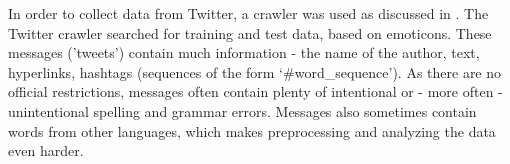 
In order to collect data from Twitter, a crawler was used as discussed in \cite{sagimoral}. The Twitter crawler searched for training and test data, based on emoticons. These messages ('tweets') contain much information - the name of the author, text, hyperlinks, hashtags (sequences of the form `\#word\_sequence'). As there are no official restrictions, messages often contain plenty of intentional or - more often - unintentional spelling and grammar errors. Messages also sometimes contain words from other languages, which makes preprocessing and analyzing the data even harder.
